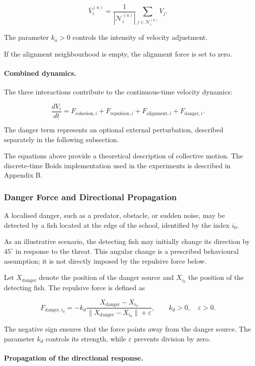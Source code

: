 \documentclass[10pt,a4paper]{article}
\begin{document}
\[
\bar V_i^{(a)}
=
\frac{1}{|\mathcal N_i^{(a)}|}
\sum_{j\in\mathcal N_i^{(a)}}V_j.
\]

The parameter $k_a>0$ controls the
intensity of velocity adjustment.

If the alignment neighbourhood is empty,
the alignment force is set to zero.

\paragraph{Combined dynamics.}

The three interactions contribute to the
continuous-time velocity dynamics:

\[
\frac{dV_i}{dt}
=
F_{\mathrm{cohesion},i}
+
F_{\mathrm{repulsion},i}
+
F_{\mathrm{alignment},i}
+
F_{\mathrm{danger},i}.
\]

The danger term represents an optional
external perturbation, described separately
in the following subsection.

The equations above provide a theoretical
description of collective motion. The
discrete-time Boids implementation used in
the experiments is described in Appendix B.

\subsubsection*{Danger Force and Directional Propagation}

A localised danger, such as a predator, obstacle, or sudden
noise, may be detected by a fish located at the edge of the
school, identified by the index $i_0$.

As an illustrative scenario, the detecting fish may initially
change its direction by $45^\circ$ in response to the threat.
This angular change is a prescribed behavioural assumption;
it is not directly imposed by the repulsive force below.

Let $X_{\mathrm{danger}}$ denote the position of the danger
source and $X_{i_0}$ the position of the detecting fish.
The repulsive force is defined as

\[
F_{\mathrm{danger},i_0}
=
-k_d
\frac{X_{\mathrm{danger}}-X_{i_0}}
{\|X_{\mathrm{danger}}-X_{i_0}\|+\varepsilon},
\qquad k_d>0,\quad\varepsilon>0.
\]

The negative sign ensures that the force points away from
the danger source. The parameter $k_d$ controls its strength,
while $\varepsilon$ prevents division by zero.

\paragraph{Propagation of the directional response.}
\end{document}
